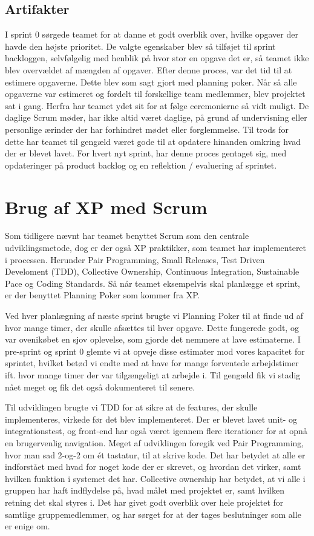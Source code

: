 \subsection{Artifakter}
I sprint 0 sørgede teamet for at danne et godt overblik over, hvilke opgaver der havde den højste prioritet. De valgte egenskaber blev så tilføjet til sprint backloggen, selvfølgelig med henblik på hvor stor en opgave det er, så teamet ikke blev overvældet af mængden af opgaver. Efter denne proces, var det tid til at estimere opgaverne. Dette blev som sagt gjort med planning poker. Når så alle opgaverne var estimeret og fordelt til forskellige team medlemmer, blev projektet sat i gang. Herfra har teamet ydet sit for at følge ceremonierne så vidt muligt. De daglige Scrum møder, har ikke altid været daglige, på grund af undervisning eller personlige ærinder der har forhindret mødet eller forglemmelse. Til trods for dette har teamet til gengæld været gode til at opdatere hinanden omkring hvad der er blevet lavet. For hvert nyt sprint, har denne proces gentaget sig, med opdateringer på product backlog og en reflektion / evaluering af sprintet. 

\section{Brug af XP med Scrum}
Som tidligere nævnt har teamet benyttet Scrum som den centrale udviklingsmetode, dog er der også XP praktikker, som teamet har implementeret i processen. Herunder Pair Programming, Small Releases, Test Driven Develoment (TDD), Collective Ownership, Continuous Integration, Sustainable Pace og Coding Standards. Så når teamet eksempelvis skal planlægge et sprint, er der benyttet Planning Poker som kommer fra XP. 

Ved hver planlægning af næste sprint brugte vi Planning Poker til at finde ud af hvor mange timer, der skulle afsættes til hver opgave. Dette fungerede godt, og var ovenikøbet en sjov oplevelse, som gjorde det nemmere at lave estimaterne. I pre-sprint og sprint 0 glemte vi at opveje disse estimater mod vores kapacitet for sprintet, hvilket betød vi endte med at have for mange forventede arbejdstimer ift. hvor mange timer der var tilgængeligt at arbejde i. Til gengæld fik vi stadig nået meget og fik det også dokumenteret til senere. 

Til udviklingen brugte vi TDD for at sikre at de features, der skulle implementeres, virkede før det blev implementeret. Der er blevet lavet unit- og integrationstest, og front-end har også været igennem flere iterationer for at opnå en brugervenlig navigation. 
Meget af udviklingen foregik ved Pair Programming, hvor man sad 2-og-2 om ét tastatur, til at skrive kode. Det har betydet at alle er indforstået med hvad for noget kode der er skrevet, og hvordan det virker, samt hvilken funktion i systemet det har. 
Collective ownership har betydet, at vi alle i gruppen har haft indflydelse på, hvad målet med projektet er, samt hvilken retning det skal styres i. Det har givet godt overblik over hele projektet for samtlige gruppemedlemmer, og har sørget for at der tages beslutninger som alle er enige om.

